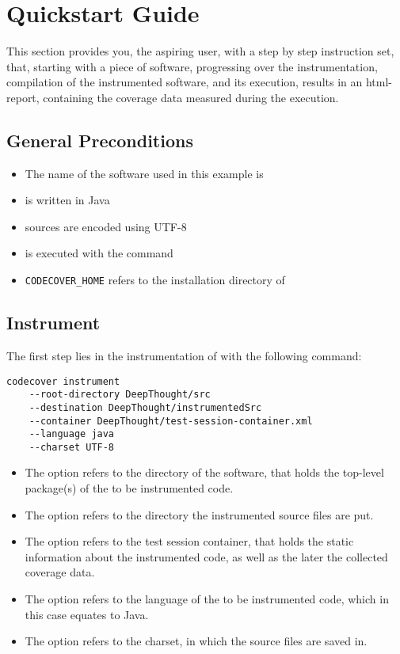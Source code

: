 \section{Quickstart Guide}\label{qsg}
This section provides you, the aspiring \codecover user, with a step by step instruction set, that, starting with a piece of software, progressing over the instrumentation, compilation of the instrumented software, and its execution, results in an html-report, containing the coverage data measured during the execution. 
\subsection{General Preconditions}
\begin{itemize}
\item The name of the software used in this example is \software
\item \software is written in Java
\item \software sources are encoded using UTF-8
\item \codecover is executed with the  command
\item \verb$CODECOVER_HOME$ refers to the installation directory of \codecover
\end{itemize}

\subsection{Instrument}
The first step lies in the instrumentation of \software with the following command: 
\begin{verbatim}
codecover instrument
    --root-directory DeepThought/src
    --destination DeepThought/instrumentedSrc 
    --container DeepThought/test-session-container.xml
    --language java 
    --charset UTF-8 
\end{verbatim}
\begin{itemize}
\item The option  refers to the directory of the software, that holds the top-level package(s) of the to be instrumented code.
\item The option  refers to the directory the instrumented source files are put.
\item The option  refers to the test session container, that holds the static information about the instrumented code, as well as the later the collected coverage data.
\item The option  refers to the language of the to be instrumented code, which in this case equates to Java.
\item The option  refers to the charset, in which the source files are saved in.
\end{itemize}

